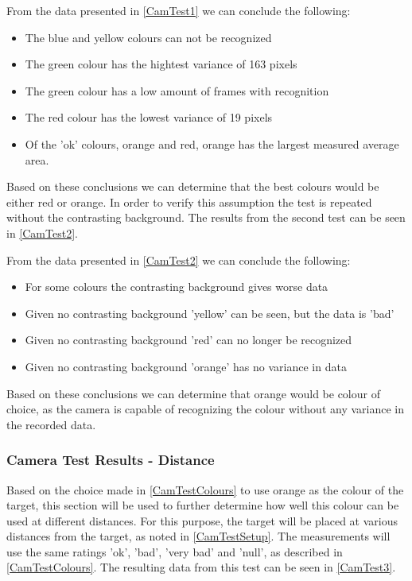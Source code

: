 
From the data presented in \autoref{CamTest1} we can conclude the
following:
\begin{itemize}
  \item The blue and yellow colours can not be recognized
  \item The green colour has the hightest variance of 163 pixels
  \item The green colour has a low amount of frames with recognition
  \item The red colour has the lowest variance of 19 pixels
  \item Of the 'ok' colours, orange and red, orange has the largest measured
  average area.
\end{itemize} 

Based on these conclusions we can determine that the best colours would be
either red or orange. In order to verify this assumption the test is repeated
without the contrasting background. The results from the second test can be seen
in \autoref{CamTest2}.


From the data presented in \autoref{CamTest2} we can conclude the
following:
\begin{itemize}
  \item For some colours the contrasting background gives worse data
  \item Given no contrasting background 'yellow' can be seen, but the data is
  'bad'
  \item Given no contrasting background 'red' can no longer be recognized
  \item Given no contrasting background 'orange' has no variance in data
\end{itemize} 

Based on these conclusions we can determine that orange would be colour of
choice, as the camera is capable of recognizing the colour without any variance
in the recorded data.

\subsubsection{Camera Test Results - Distance}\label{CamTestDistance}
Based on the choice made in \autoref{CamTestColours} to use orange as the colour
of the target, this section will be used to further determine how well this
colour can be used at different distances. For this purpose, the target will be
placed at various distances from the target, as noted in \autoref{CamTestSetup}.
The measurements will use the same ratings 'ok', 'bad', 'very bad' and 'null',
as described in \autoref{CamTestColours}. The resulting data from this test can be
seen in \autoref{CamTest3}. 

